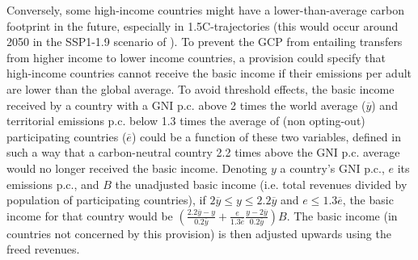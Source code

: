 \documentclass[12pt,english]{article}
\begin{document}
Conversely, some high-income countries might have a lower-than-average carbon footprint in the future, especially in 1.5\textdegree{}C-trajectories (this would occur around 2050 in the SSP1-1.9 scenario of \citealp{van_vuuren_energy_2017}). To prevent the GCP from entailing transfers from higher income to lower income countries, a provision could specify that high-income countries cannot receive the basic income if their emissions per adult are lower than the global average. To avoid threshold effects, the basic income received by a country with a GNI p.c. above 2 times the world average ($\overline{y}$) and territorial emissions p.c. below 1.3 times the average of (non opting-out) participating countries ($\overline{e}$) could be a function of these two variables, defined in such a way that a carbon-neutral country 2.2 times above the GNI p.c. average would no longer received the basic income. Denoting $y$ a country's GNI p.c., $e$ its emissions p.c., and $B$ the unadjusted basic income (i.e. total revenues divided by population of participating countries), if $2\overline{y}\leq y\leq 2.2\overline{y}$ and $e \leq 1.3 \overline{e}$, the basic income for that country would be $\left( \frac{2.2\overline{y}-y}{0.2\overline{y}} + \frac{e}{1.3\overline{e}} \frac{y-2\overline{y}}{0.2\overline{y}} \right) B$. The basic income (in countries not concerned by this provision) is then adjusted upwards using the freed revenues.


\end{document}
